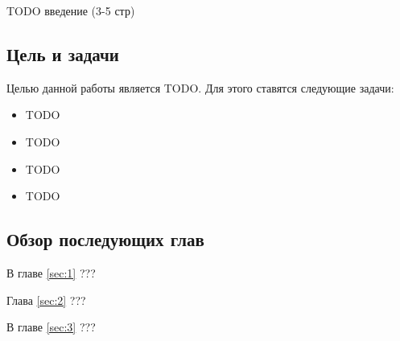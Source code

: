 \documentclass[../diploma.tex]{subfiles}
\begin{document}
 \label{sec:introduction}

TODO введение (3-5 стр)

\subsection*{Цель и задачи}

Целью данной работы является TODO. Для этого ставятся следующие задачи:

\begin{itemize}
	\item TODO
	\item TODO
	\item TODO
	\item TODO
\end{itemize}

\subsection*{Обзор последующих глав}

В главе \ref{sec:1} ???

Глава \ref{sec:2} ???

В главе \ref{sec:3} ???
\end{document}
